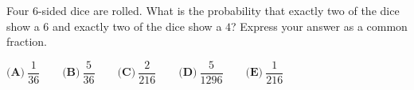 Four $6$-sided dice are rolled. What is the probability that exactly two of the dice show a $6$ and exactly two of the dice show a $4$? Express your answer as a common fraction.

$\textbf{(A)}~\dfrac{1}{36}\qquad\textbf{(B)}~\dfrac{5}{36}\qquad\textbf{(C)}~\dfrac{2}{216}\qquad\textbf{(D)}~\dfrac{5}{1296}\qquad\textbf{(E)}~\dfrac{1}{216}\qquad$
